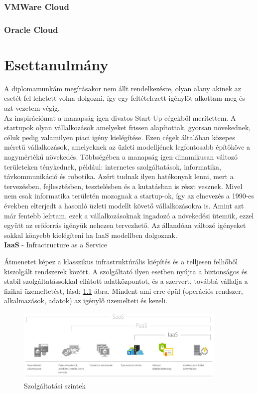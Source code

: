 \documentclass[12pt,oneside,justify,table]{book}
\begin{document}
\subsection{VMWare Cloud}


\subsection{Oracle Cloud}


\chapter{Esettanulmány}

A diplomamunkám megírásakor nem állt rendelkezésre, olyan alany akinek az esetét fel lehetett volna dolgozni, így egy feltételezett igénylőt alkottam meg és azt vezetem végig. \\

Az inspirációmat a manapság igen divatos Start-Up cégekből merítettem. A startupok olyan vállalkozások amelyeket frissen alapítottak, gyorsan növekednek, céluk pedig valamilyen piaci igény kielégítése. Ezen cégek általában közepes méretű vállalkozások, amelyeknek az üzleti modelljének legfontosabb építőköve a nagymértékű növekedés. Többségében a manapság igen dinamikusan változó területeken ténykednek, például: internetes szolgáltatások, informatika, távkommunikáció és robotika. Azért tudnak ilyen hatékonyak lenni, mert a tervezésben, fejlesztésben, tesztelésben és a kutatásban is részt vesznek. Mivel nem csak informatika területén mozognak a startup-ok, így az elnevezés a 1990-es években elterjedt a hasonló üzleti modellt követő vállalkozásokra is.
Amint azt már fentebb leírtam, ezek a vállalkozásoknak ingadozó a növekedési ütemük, ezzel együtt az erőforrás igényük nehezen tervezhető.  Az állandóan változó igényeket sokkal könyebb kielégíteni ha IaaS modellben dolgoznak.\\

\noindent \textbf{IaaS} - Infractructure as a Service \cite{IaaS}

Átmenetet képez a klasszikus infrastruktúrális kiépítés és a telljesen felhőből kiszolgált rendszerek között. A szolgáltató ilyen esetben nyújta a biztonságos és stabil szolgáltatássokkal ellátott adatközpontot, és a szervert, továbbá vállalja a fizikai üzemeltetést, lásd: \ref{fig:aaS} ábra. Mindent ami erre épül (operációs rendszer, alkalmazások, adatok) az igénylő üzemelteti és kezeli. 
\begin{figure}[ht]
\centering
\includegraphics[width=0.9\textwidth]{aaS.jpg}
\caption{Szolgáltatási szintek}
\label{fig:aaS}
\end{figure}
\end{document}
